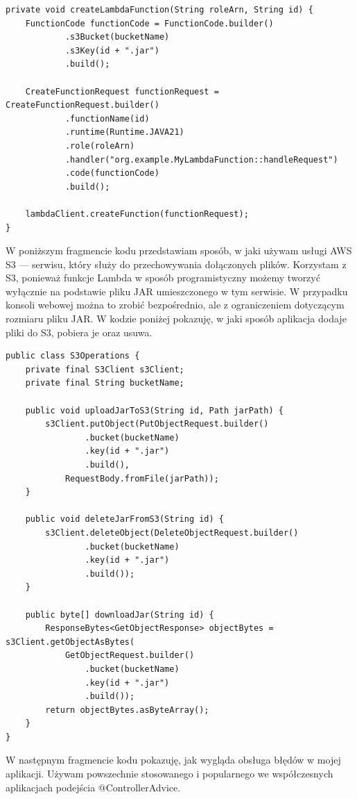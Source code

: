 \documentclass[runningheads,12pt]{llncs}
\begin{document}
\begin{verbatim}
private void createLambdaFunction(String roleArn, String id) {
    FunctionCode functionCode = FunctionCode.builder()
            .s3Bucket(bucketName)
            .s3Key(id + ".jar")
            .build();

    CreateFunctionRequest functionRequest = CreateFunctionRequest.builder()
            .functionName(id)
            .runtime(Runtime.JAVA21)
            .role(roleArn)
            .handler("org.example.MyLambdaFunction::handleRequest")
            .code(functionCode)
            .build();

    lambdaClient.createFunction(functionRequest);
}
\end{verbatim}

W poniższym fragmencie kodu przedstawiam sposób, w jaki używam usługi AWS S3 — serwisu, który służy do przechowywania dołączonych plików. Korzystam z S3, ponieważ funkcje Lambda w sposób programistyczny możemy tworzyć wyłącznie na podstawie pliku JAR umieszczonego w tym serwisie. W przypadku konsoli webowej można to zrobić bezpośrednio, ale z ograniczeniem dotyczącym rozmiaru pliku JAR. W kodzie poniżej pokazuję, w jaki sposób aplikacja dodaje pliki do S3, pobiera je oraz usuwa.

\begin{verbatim}
public class S3Operations {
    private final S3Client s3Client;
    private final String bucketName;

    public void uploadJarToS3(String id, Path jarPath) {
        s3Client.putObject(PutObjectRequest.builder()
                .bucket(bucketName)
                .key(id + ".jar")
                .build(),
            RequestBody.fromFile(jarPath));
    }

    public void deleteJarFromS3(String id) {
        s3Client.deleteObject(DeleteObjectRequest.builder()
                .bucket(bucketName)
                .key(id + ".jar")
                .build());
    }

    public byte[] downloadJar(String id) {
        ResponseBytes<GetObjectResponse> objectBytes = s3Client.getObjectAsBytes(
            GetObjectRequest.builder()
                .bucket(bucketName)
                .key(id + ".jar")
                .build());
        return objectBytes.asByteArray();
    }
}
\end{verbatim}

W następnym fragmencie kodu pokazuję, jak wygląda obsługa błędów w mojej aplikacji. Używam powszechnie stosowanego i popularnego we współczesnych aplikacjach podejścia @ControllerAdvice.
\end{document}
